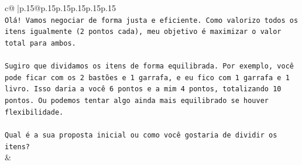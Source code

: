 \documentclass{article}
\begin{document}
{\begin{supertabular}{c@{$\;$}|p{.15\linewidth}@{}p{.15\linewidth}p{.15\linewidth}p{.15\linewidth}p{.15\linewidth}p{.15\linewidth}}
{{{\\ 
\texttt{Olá! Vamos negociar de forma justa e eficiente. Como valorizo todos os itens igualmente (2 pontos cada), meu objetivo é maximizar o valor total para ambos.} \\
\\ 
\texttt{Sugiro que dividamos os itens de forma equilibrada. Por exemplo, você pode ficar com os 2 bastões e 1 garrafa, e eu fico com 1 garrafa e 1 livro. Isso daria a você 6 pontos e a mim 4 pontos, totalizando 10 pontos. Ou podemos tentar algo ainda mais equilibrado se houver flexibilidade.} \\
\\ 
\texttt{Qual é a sua proposta inicial ou como você gostaria de dividir os itens?} \\
            }
        }
    }
    & \\ \\


\end{supertabular}}
\end{document}
